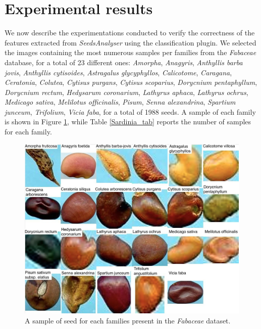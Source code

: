\documentclass[twocolumn]{svjour3}           %
\begin{document}

\section{Experimental results} 
\label{sec:results}
We now describe the experimentations conducted to verify the correctness of the features extracted from \emph{SeedsAnalyser} using the classification plugin.
We selected the images containing the most numerous samples per families from the \emph{Fabaceae} database, for a total of 23 different ones: 
\emph{Amorpha}, \emph{Anagyris}, \emph{Anthyllis barba jovis}, \emph{Anthyllis cytisoides}, \emph{Astragalus glycyphyllos}, \emph{Calicotome}, \emph{Caragana}, \emph{Ceratonia}, \emph{Colutea}, \emph{Cytisus purgans}, \emph{Cytisus scoparius}, \emph{Dorycnium pentaphyllum}, \emph{Dorycnium rectum}, \emph{Hedysarum coronarium}, \emph{Lathyrus aphaca}, \emph{Lathyrus ochrus}, \emph{Medicago sativa}, \emph{Melilotus officinalis}, \emph{Pisum}, \emph{Senna alexandrina}, \emph{Spartium junceum}, \emph{Trifolium}, \emph{Vicia faba}, for a total of 1988 seeds.
A sample of each family is shown in Figure \ref{Sardinia_samples}, while Table \ref{Sardinia_tab} reports the number of samples for each family.

\begin{figure}[htbp]
	\centering
	\includegraphics[scale=0.6]{fig_sardiniaSamples.jpg}
	\caption{A sample of seed for each families present in the \emph{Fabaceae} dataset.}
	\label{Sardinia_samples}
\end{figure}
\end{document}
